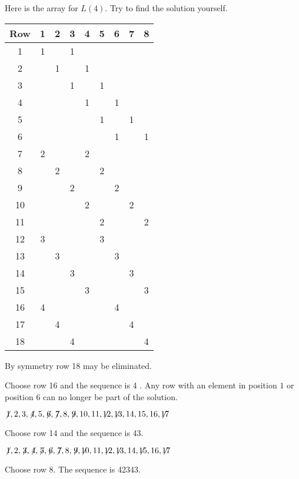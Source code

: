 Here is the array for $L(4)$. Try to find the solution yourself.
\begin{center}
\addtolength{\tabcolsep}{1mm}
\begin{tabular}{|c||c|c|c|c|c|c|c|c|}
\hline
Row&1&2&3&4&5&6&7&8\\\hline\hline
1&1&&1&&&&&\\\hline
2&&1&&1&&&&\\\hline
3&&&1&&1&&&\\\hline
4&&&&1&&1&&\\\hline
5&&&&&1&&1&\\\hline
6&&&&&&1&&1\\\hline
7&2&&&2&&&&\\\hline
8&&2&&&2&&&\\\hline
9&&&2&&&2&&\\\hline
10&&&&2&&&2&\\\hline
11&&&&&2&&&2\\\hline
12&3&&&&3&&&\\\hline
13&&3&&&&3&&\\\hline
14&&&3&&&&3&\\\hline
15&&&&3&&&&3\\\hline
16&4&&&&&4&&\\\hline
17&&4&&&&&4&\\\hline
18&&&4&&&&&4\\\hline
\end{tabular}
\end{center}
By symmetry row 18 may be eliminated.

\smallskip

\noindent Choose row 16 and the sequence is 4\textvisiblespace\textvisiblespace\textvisiblespace{} \textvisiblespace\textvisiblespace.
Any row with an element in position $1$ or position $6$ can no longer be part of the solution.

$\not\! 1,2,3,\not\! 4,5,\not\! 6,\not\! 7,8,\not\! 9,10,11,\not\!\! 12,\not\!\! 13,14,15,16,\not\!\! 17$

\noindent Choose row 14 and the sequence is 4\textvisiblespace{}3\textvisiblespace.

$\not\! 1,2,\not\! 3,\not\! 4,\not\! 5,\not\! 6,\not\! 7,8,\not\! 9,\not\!\! 10,11,\not\!\! 12,\not\!\! 13,14, \not\!\! 15,16,\not\!\! 17$

\noindent Choose row 8. The sequence is 4{}2{}34{}3\textvisiblespace.

